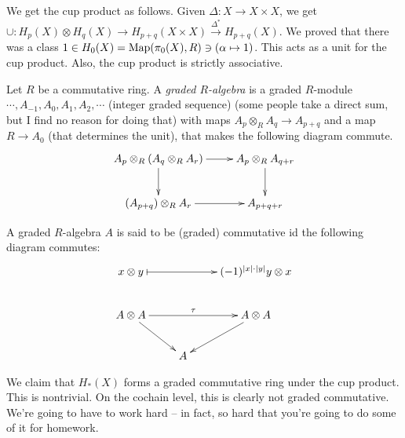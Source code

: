 We get the cup product as follows. Given $\Delta:X\to X\times X$, we get $\cup: H_p(X)\otimes H_q(X)\to H_{p+q}(X\times X)\xrightarrow{\Delta^\ast} H_{p+q}(X)$. We proved that there was a class $1\in H_0(X)=\operatorname{Map}(\pi_0(X),R)\ni (\alpha\mapsto 1)$. This acts as a unit for the cup product. Also, the cup product is strictly associative.
\begin{definition}
Let $R$ be a commutative ring. A \emph{graded $R$-algebra} is a graded $R$-module $\cdots,A_{-1},A_0, A_1,A_2,\cdots$ (integer graded sequence) (some people take a direct sum, but I find no reason for doing that) with maps $A_p\otimes_R A_q\to A_{p+q}$ and a map $R\to A_0$ (that determines the unit), that makes the following diagram commute.
\begin{equation*}
\xymatrix{
	A_p\otimes_R (A_q\otimes_R A_r)\ar[r]\ar[d] & A_p\otimes_R A_{q+r}\ar[d]\\
	(A_{p+q})\otimes_R A_r \ar[r] & A_{p+q+r}
}
\end{equation*}
\end{definition}
\begin{definition}
A graded $R$-algebra $A$ is said to be (graded) commutative id the following diagram commutes:
\begin{equation*}
\xymatrix{
	x\otimes y\ar@{|->}[rr] & & (-1)^{|x|\cdot|y|}y\otimes x\\
	A\otimes A\ar[rr]^{\tau}\ar[dr] & & A\otimes A\ar[dl]\\
	 & A & 
}
\end{equation*}
\end{definition}
We claim that $ H_\ast(X)$ forms a graded commutative ring under the cup product. This is nontrivial. On the cochain level, this is clearly not graded commutative. We're going to have to work hard -- in fact, so hard that you're going to do some of it for homework.

